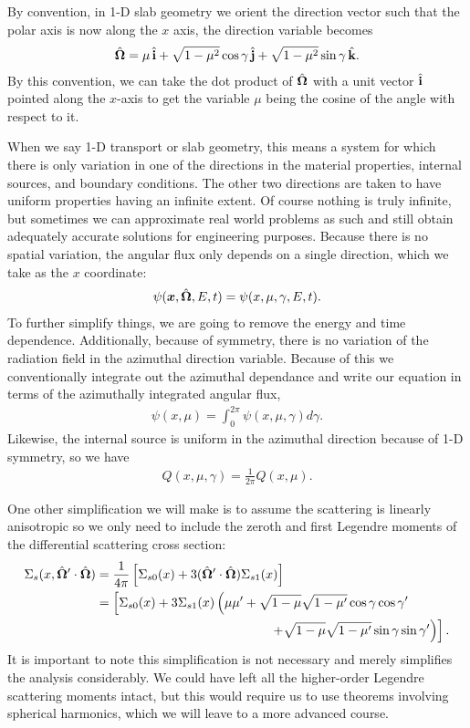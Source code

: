 By convention, in 1-D slab geometry we orient the direction vector such that the polar axis is now along the $x$ axis, the direction variable becomes
\begin{align}
  \hat{\mathbf{\Omega}} = \mu \, \hat{\mathbf{i}} + \sqrt{ 1 - \mu^2 } \cos\gamma \, \hat{\mathbf{j}} + \sqrt{ 1 - \mu^2 } \sin\gamma \, \hat{\mathbf{k}} .
\end{align}
By this convention, we can take the dot product of $\hat{\mathbf{\Omega}}$ with a unit vector $\hat{\mathbf{i}}$ pointed along the $x$-axis to get the variable $\mu$ being the cosine of the angle with respect to it.

When we say 1-D transport or slab geometry, this means a system for which there is only variation in one of the directions in the material properties, internal sources, and boundary conditions. The other two directions are taken to have uniform properties having an infinite extent. Of course nothing is truly infinite, but sometimes we can approximate real world problems as such and still obtain adequately accurate solutions for engineering purposes. Because there is no spatial variation, the angular flux only depends on a single direction, which we take as the $x$ coordinate:
\begin{align}
  \psi(\bm{x},\hat{\mathbf{\Omega}},E,t) = \psi(x,\mu,\gamma,E,t) . 
\end{align}
To further simplify things, we are going to remove the energy and time dependence. Additionally, because of symmetry, there is no variation of the radiation field in the azimuthal direction variable. Because of this we conventionally integrate out the azimuthal dependance and write our equation in terms of the azimuthally integrated angular flux,
\begin{align}
  \psi(x,\mu) = \int_0^{2\pi} \psi(x,\mu,\gamma) d\gamma .
\end{align}
Likewise, the internal source is uniform in the azimuthal direction because of 1-D symmetry, so we have
\begin{align}
  Q(x,\mu,\gamma) = \frac{1}{2\pi} Q(x,\mu) .
\end{align}



One other simplification we will make is to assume the scattering is linearly anisotropic so we only need to include the zeroth and first Legendre moments of the differential scattering cross section:
\begin{align}
  \Sigma_s(x,\dir' \cdot \dir) &= \frac{1}{4\pi} \left[ \Sigma_{s0}(x) + 3 ( \dir' \cdot \dir ) \Sigma_{s1}(x) \right] \nonumber \\*
  &= \left[ \Sigma_{s0}(x) + 3 \Sigma_{s1}(x) \left( \mu \mu' + \sqrt{ 1 - \mu } \sqrt{ 1 - \mu' } \cos\gamma \cos\gamma' \right. \right. \nonumber \\*
  &\hspace{4.75cm} \left. \left. + \sqrt{ 1 - \mu } \sqrt{ 1 - \mu' } \sin\gamma \sin\gamma' \right) \right] .
\end{align}
It is important to note this simplification is not necessary and merely simplifies the analysis considerably. We could have left all the higher-order Legendre scattering moments intact, but this would require us to use theorems involving spherical harmonics, which we will leave to a more advanced course.

